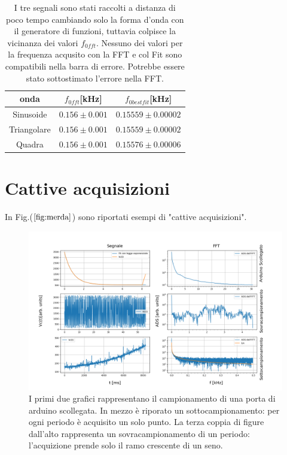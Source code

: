 \documentclass{article}
\begin{document}
        \begin{table}[H]
            \centering

                \begin{tabular}{ccc}
                    onda            &   $f_{0fft}$[kHz]                     & $f_{0bestfit}$[kHz] \\
                    \hline
                    Sinusoide       &   $0.156 \pm 0.001$           & $0.15559 \pm 0.00002$ \\
                    Triangolare     &   $0.156 \pm 0.001$           & $0.15559 \pm 0.00002$ \\
                    Quadra          &   $0.156 \pm 0.001$           & $0.15576 \pm 0.00006$ \\
                \end{tabular}
                \caption{I tre segnali sono stati raccolti a distanza di poco tempo
                cambiando solo la forma d'onda con il generatore di funzioni,
                tuttavia colpisce la vicinanza dei valori $f_{0fft}$.
                Nessuno dei valori per la frequenza acqusito con la FFT
                e col Fit sono compatibili nella barra di errore.
                Potrebbe essere stato sottostimato l'errore nella FFT.}
                \label{tab:for_dis}
        \end{table}

\section{Cattive acquisizioni}

    In Fig.($\ref{fig:merda}$) sono riportati esempi di "cattive acquisizioni".

        \begin{figure}[H]
            \centering
            \includegraphics[width=\textwidth]{FFT5/FFTwaveforms4.png}
            \caption{I primi due grafici rappresentano il campionamento di una porta di arduino scollegata.
            In mezzo è riporato un sottocampionamento: per ogni periodo è acquisito un 
            solo punto.
            La terza coppia di figure dall'alto rappresenta un sovracampionamento 
            di un periodo: l'acquizione prende  solo il ramo crescente di un seno.}
            \label{fig:merda}
        \end{figure}  
    
\end{document}
